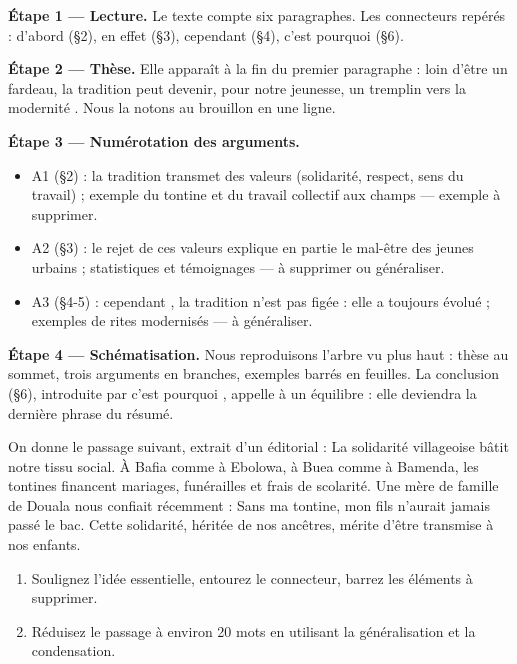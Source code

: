 \documentclass[11pt]{article}
\begin{document}
\textbf{Étape 1 — Lecture.} Le texte compte six paragraphes. Les connecteurs repérés : \og d'abord \fg{} (§2), \og en effet \fg{} (§3), \og cependant \fg{} (§4), \og c'est pourquoi \fg{} (§6).

\textbf{Étape 2 — Thèse.} Elle apparaît à la fin du premier paragraphe : \og loin d'être un fardeau, la tradition peut devenir, pour notre jeunesse, un tremplin vers la modernité \fg. Nous la notons au brouillon en une ligne.

\textbf{Étape 3 — Numérotation des arguments.}
\begin{itemize}
\item A1 (§2) : la tradition transmet des valeurs (solidarité, respect, sens du travail) ; exemple du tontine et du travail collectif aux champs — exemple à supprimer.
\item A2 (§3) : le rejet de ces valeurs explique en partie le mal-être des jeunes urbains ; statistiques et témoignages — à supprimer ou généraliser.
\item A3 (§4-5) : \og cependant \fg, la tradition n'est pas figée : elle a toujours évolué ; exemples de rites modernisés — à généraliser.
\end{itemize}

\textbf{Étape 4 — Schématisation.} Nous reproduisons l'arbre vu plus haut : thèse au sommet, trois arguments en branches, exemples barrés en feuilles. La conclusion (§6), introduite par \og c'est pourquoi \fg, appelle à un équilibre : elle deviendra la dernière phrase du résumé.

\begin{exercice}
On donne le passage suivant, extrait d'un éditorial : \og La solidarité villageoise bâtit notre tissu social. À Bafia comme à Ebolowa, à Buea comme à Bamenda, les tontines financent mariages, funérailles et frais de scolarité. Une mère de famille de Douala nous confiait récemment : \og Sans ma tontine, mon fils n'aurait jamais passé le bac. \fg{} Cette solidarité, héritée de nos ancêtres, mérite d'être transmise à nos enfants. \fg
\begin{enumerate}
\item Soulignez l'idée essentielle, entourez le connecteur, barrez les éléments à supprimer.
\item Réduisez le passage à environ 20 mots en utilisant la généralisation et la condensation.
\end{enumerate}
\end{exercice}
\end{document}
